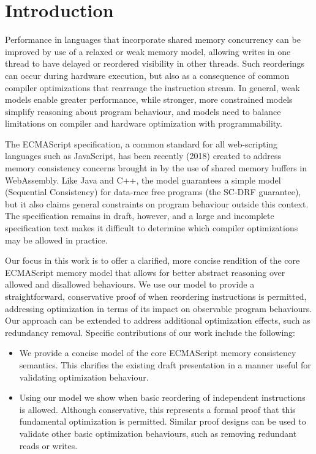 \section{Introduction}

Performance in languages that incorporate shared memory concurrency can be improved by use of a relaxed or weak memory model, allowing writes in one thread to have delayed or reordered visibility in other threads.  Such reorderings can occur during hardware execution, but also as a consequence of common compiler optimizations that rearrange the instruction stream.  In general, weak models enable greater performance, while stronger, more constrained models simplify reasoning about program behaviour, and models need to balance limitations on compiler and hardware optimization with programmability.

The ECMAScript specification, a common standard for all web-scripting languages such as JavaScript, has been recently (2018) created to address memory consistency concerns brought in by the use of shared memory buffers in WebAssembly.  Like Java and C++, the model guarantees a simple model (Sequential Consistency) for data-race free programs (the SC-DRF guarantee), but it also claims general constraints on program behaviour outside this context.  The specification remains in draft, however, and a large and incomplete specification text makes it difficult to determine which compiler optimizations may be allowed in practice.

Our focus in this work is to offer a clarified, more concise rendition of the core ECMAScript memory model that allows for better abstract reasoning over allowed and disallowed behaviours.  We use our model to provide a straightforward, conservative proof of when reordering instructions is permitted, addressing optimization in terms of its impact on observable program behaviours.  Our approach can be extended to address additional optimization effects, such as redundancy removal.  Specific contributions of our work include the following:
\begin{itemize}
\item We provide a concise model of the core ECMAScript memory consistency semantics.  This clarifies the existing draft presentation in a manner useful for validating optimization behaviour.
\item Using our model we show when basic reordering of independent instructions is allowed.  Although conservative, this represents a formal proof that this fundamental optimization is permitted.  Similar proof designs can be used to validate other basic optimization behaviours, such as removing redundant reads or writes.
\end{itemize}
